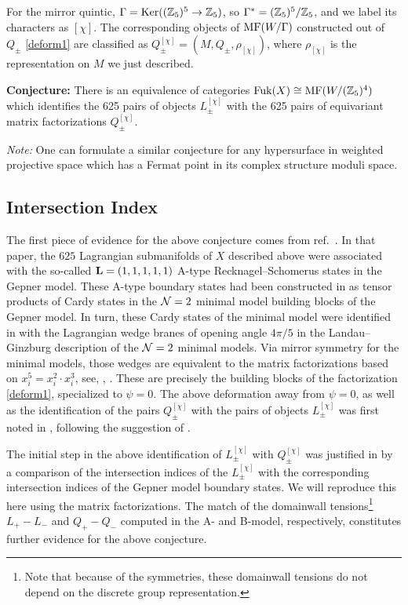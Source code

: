 For the mirror quintic, $\Gamma = {\rm Ker}(({\mathbb Z}_5)^5\to{\mathbb Z}_5)$, so 
$\Gamma^* = ({\mathbb Z}_5)^5/{\mathbb Z}_5$, and we label its characters as $[\chi]$. 
The corresponding objects of ${\rm MF}(W/\Gamma)$ constructed out of $Q_\pm$ \eqref{deform1} 
are classified as $Q_\pm^{[\chi]}=(M,Q_\pm,\rho_{[\chi]})$, where $\rho_{[\chi]}$ is the 
representation on $M$ we just described.

\medskip

{\bf Conjecture:} There is an equivalence of categories ${\rm Fuk}(X)\cong {\rm MF}(W/({\mathbb Z}_5)^4)$
which identifies the 625 pairs of objects $L_\pm^{[\chi]}$ with the 625 pairs of 
equivariant matrix factorizations $Q_\pm^{[\chi]}$.


\medskip

{\it Note:} One can formulate a similar conjecture for any hypersurface in weighted 
projective space which has a Fermat point in its complex structure moduli space.


\subsection{Intersection Index}

The first piece of evidence for the above conjecture comes from ref.\ \cite{bdlr}.
In that paper, the $625$ Lagrangian submanifolds of $X$ described above were associated
with the so-called ${\bf L}=(1,1,1,1,1)$ A-type Recknagel--Schomerus states in the Gepner 
model. These A-type boundary states had been constructed in \cite{resc} as tensor products 
of Cardy states in the ${\cal N}=2$ minimal model building blocks of the Gepner model. In 
turn, these Cardy states of the minimal model were identified in \cite{hiv} with the 
Lagrangian wedge branes of opening angle $4\pi/5$ in the Landau--Ginzburg description of the 
${\cal N}=2$ minimal models. Via mirror symmetry for the minimal models, those wedges are 
equivalent to the matrix factorizations based on $x_i^5=x_i^2\cdot x_i^3$, see, \eg, 
\cite{horiminimal}. These are precisely the building blocks of the factorization 
\eqref{deform1}, specialized to $\psi=0$. The above deformation away from $\psi=0$,
as well as the identification of the pairs $Q_\pm^{[\chi]}$ with the pairs of objects
$L_\pm^{[\chi]}$ was first noted in \cite{howa}, following the suggestion of \cite{bdlr}.

The initial step in the above identification of $L_\pm^{[\chi]}$ with $Q_\pm^{[\chi]}$ 
was justified in \cite{bdlr} by a comparison of the intersection indices of the 
$L_\pm^{[\chi]}$ with the corresponding intersection indices of the Gepner model boundary
states. We will reproduce this here using the matrix factorizations. The match of the 
domainwall tensions\footnote{Note that because of the symmetries,
these domainwall tensions do not depend on the discrete group representation.} $L_+-L_-$ and $Q_+-Q_-$ computed in 
the A- and B-model, respectively, constitutes further evidence for the above 
conjecture. 

